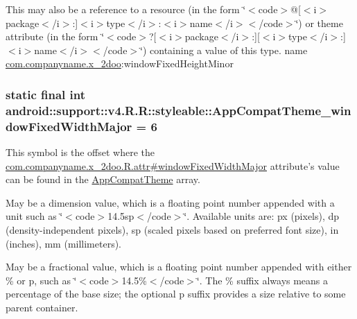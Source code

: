 This may also be a reference to a resource (in the form \char`\"{}$<$code$>$@\mbox{[}$<$i$>$package$<$/i$>$:\mbox{]}$<$i$>$type$<$/i$>$:$<$i$>$name$<$/i$>$$<$/code$>$\char`\"{}) or theme attribute (in the form \char`\"{}$<$code$>$?\mbox{[}$<$i$>$package$<$/i$>$:\mbox{]}\mbox{[}$<$i$>$type$<$/i$>$:\mbox{]}$<$i$>$name$<$/i$>$$<$/code$>$\char`\"{}) containing a value of this type.  name \hyperlink{namespacecom_1_1companyname_1_1x__2doo}{com.companyname.x\_\-2doo}:windowFixedHeightMinor \hypertarget{classandroid_1_1support_1_1v4_1_1_r_1_1styleable_307ec462d988be66e4bf9bd5ef416bc4}{
\subsubsection[{AppCompatTheme\_\-windowFixedWidthMajor}]{\setlength{\rightskip}{0pt plus 5cm}static final int android::support::v4.R.R::styleable::AppCompatTheme\_\-windowFixedWidthMajor = 6}}
\label{classandroid_1_1support_1_1v4_1_1_r_1_1styleable_307ec462d988be66e4bf9bd5ef416bc4}


This symbol is the offset where the \hyperlink{classcom_1_1companyname_1_1x__2doo_1_1_r_1_1attr_783737b734e94a569fc9c1cb433ed12e}{com.companyname.x\_\-2doo.R.attr\#windowFixedWidthMajor} attribute's value can be found in the \hyperlink{classandroid_1_1support_1_1v4_1_1_r_1_1styleable_0873e92ba21076bb5a4aeadeb7f5779f}{AppCompatTheme} array.

May be a dimension value, which is a floating point number appended with a unit such as \char`\"{}$<$code$>$14.5sp$<$/code$>$\char`\"{}. Available units are: px (pixels), dp (density-independent pixels), sp (scaled pixels based on preferred font size), in (inches), mm (millimeters). 

May be a fractional value, which is a floating point number appended with either \% or p, such as \char`\"{}$<$code$>$14.5\%$<$/code$>$\char`\"{}. The \% suffix always means a percentage of the base size; the optional p suffix provides a size relative to some parent container. 

